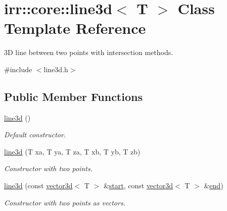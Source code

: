 \hypertarget{classirr_1_1core_1_1line3d}{}\section{irr\+:\+:core\+:\+:line3d$<$ T $>$ Class Template Reference}
\label{classirr_1_1core_1_1line3d}


3D line between two points with intersection methods.  




{\ttfamily \#include $<$line3d.\+h$>$}

\subsection*{Public Member Functions}
\begin{DoxyCompactItemize}
\item 
\hyperlink{classirr_1_1core_1_1line3d_ab88640572a102a9eebd1bf483b7d7e75}{line3d} ()
\begin{DoxyCompactList}\small\item\em Default constructor. \end{DoxyCompactList}\item 
\mbox{\label{classirr_1_1core_1_1line3d_a19bc6c5661d8913ac6911b2513f7804f}} 
\hyperlink{classirr_1_1core_1_1line3d_a19bc6c5661d8913ac6911b2513f7804f}{line3d} (T xa, T ya, T za, T xb, T yb, T zb)
\begin{DoxyCompactList}\small\item\em Constructor with two points. \end{DoxyCompactList}\item 
\mbox{\label{classirr_1_1core_1_1line3d_a9f77afda569d38afe68c9c3db39037f4}} 
\hyperlink{classirr_1_1core_1_1line3d_a9f77afda569d38afe68c9c3db39037f4}{line3d} (const \hyperlink{classirr_1_1core_1_1vector3d}{vector3d}$<$ T $>$ \&\hyperlink{classirr_1_1core_1_1line3d_a6b7683c8ac164e209b195fc439269a1b}{start}, const \hyperlink{classirr_1_1core_1_1vector3d}{vector3d}$<$ T $>$ \&\hyperlink{classirr_1_1core_1_1line3d_a49cd73380569e7e6958369520fe1b7bf}{end})
\begin{DoxyCompactList}\small\item\em Constructor with two points as vectors. \end{DoxyCompactList}\item 

\end{DoxyCompactItemize}
